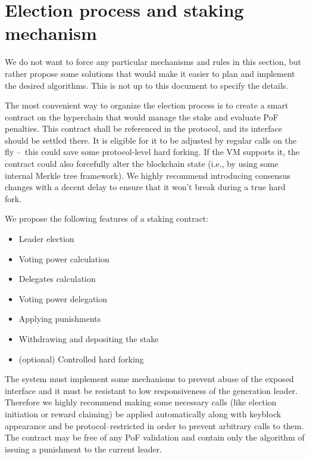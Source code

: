 \section{Election process and staking mechanism}

We do not want to force any particular mechanisms and rules in this section, but
rather propose some solutions that would make it easier to plan and implement
the desired algorithms. This is not up to this document to specify the details.

The most convenient way to organize the election process is to create a smart
contract on the hyperchain that would manage the stake and evaluate PoF
penalties. This contract shall be referenced in the protocol, and its interface
should be settled there. It is eligible for it to be adjusted by regular calls on the fly
– this could save some protocol-level hard forking. If the VM supports it, the
contract could also forcefully alter the blockchain state (i.e., by using some
internal Merkle tree framework). We highly recommend introducing consensus
changes with a decent delay to ensure that it won't break during a true hard fork.

We propose the following features of a staking contract:
\begin{itemize}
\item Leader election
\item Voting power calculation
\item Delegates calculation
\item Voting power delegation
\item Applying punishments
\item Withdrawing and depositing the stake
\item (optional) Controlled hard forking
\end{itemize}

The system must implement some mechanisms to prevent abuse of the exposed
interface and it must be resistant to low responsiveness
of the generation leader. Therefore we highly recommend making some necessary
calls (like election initiation or reward claiming) be applied automatically
along with keyblock appearance and be protocol–restricted in order to prevent
arbitrary calls to them. The contract may be free of any PoF validation and
contain only the algorithm of issuing a punishment to the current leader.
